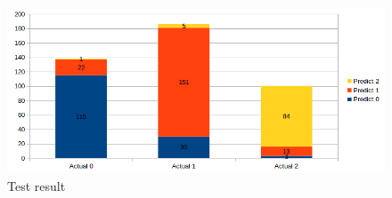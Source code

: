 \documentclass[11pt]{article}
\begin{document}
\begin{figure}[H]
\centering
\includegraphics[width=1\textwidth]{images/result_large_dataset}
\caption{Test result}
\end{figure}



\end{document}
